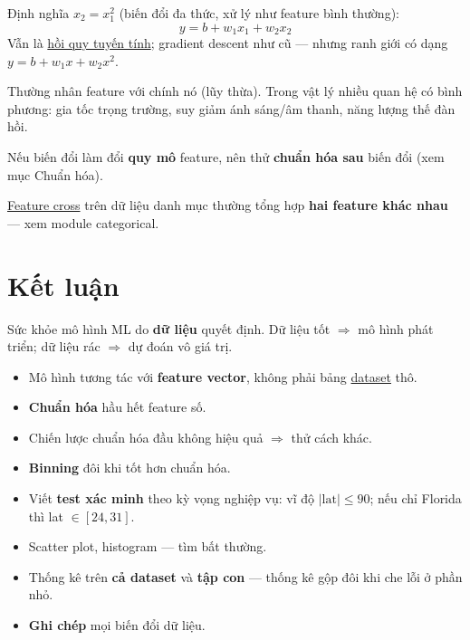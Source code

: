 \documentclass[12pt,a4paper]{article}
\begin{document}
Định nghĩa $x_2 = x_1^2$ (biến đổi đa thức, xử lý như feature bình thường):
\[
  y = b + w_1 x_1 + w_2 x_2
\]
Vẫn là \href{https://developers.google.com/machine-learning/glossary\#linear_regression}{hồi quy tuyến tính}; gradient descent như cũ --- nhưng ranh giới có dạng $y = b + w_1 x + w_2 x^2$.

Thường nhân feature với chính nó (lũy thừa). Trong vật lý nhiều quan hệ có bình phương: gia tốc trọng trường, suy giảm ánh sáng/âm thanh, năng lượng thế đàn hồi.

\begin{luuy}
Nếu biến đổi làm đổi \textbf{quy mô} feature, nên thử \textbf{chuẩn hóa sau} biến đổi (xem mục Chuẩn hóa).
\end{luuy}

\begin{ynghia}[title={Liên quan dữ liệu danh mục}]
\href{https://developers.google.com/machine-learning/glossary\#feature_cross}{Feature cross} trên dữ liệu danh mục thường tổng hợp \textbf{hai feature khác nhau} --- xem module categorical.
\end{ynghia}

\section{Kết luận}

\begin{dongco}
Sức khỏe mô hình ML do \textbf{dữ liệu} quyết định. Dữ liệu tốt $\Rightarrow$ mô hình phát triển; dữ liệu rác $\Rightarrow$ dự đoán vô giá trị.
\end{dongco}

\begin{phuongphap}[title={Thực hành tốt với dữ liệu số}]
\begin{itemize}
  \item Mô hình tương tác với \textbf{feature vector}, không phải bảng \href{https://developers.google.com/machine-learning/glossary\#dataset}{dataset} thô.
  \item \textbf{Chuẩn hóa} hầu hết feature số.
  \item Chiến lược chuẩn hóa đầu không hiệu quả $\Rightarrow$ thử cách khác.
  \item \textbf{Binning} đôi khi tốt hơn chuẩn hóa.
  \item Viết \textbf{test xác minh} theo kỳ vọng nghiệp vụ: vĩ độ $|\text{lat}| \le 90$; nếu chỉ Florida thì lat $\in [24, 31]$.
  \item Scatter plot, histogram --- tìm bất thường.
  \item Thống kê trên \textbf{cả dataset} và \textbf{tập con} --- thống kê gộp đôi khi che lỗi ở phần nhỏ.
  \item \textbf{Ghi chép} mọi biến đổi dữ liệu.
\end{itemize}
\end{phuongphap}
\end{document}
